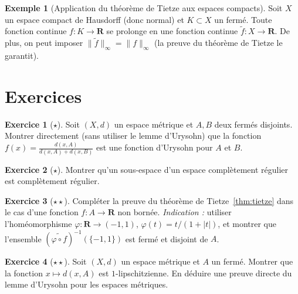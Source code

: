 \documentclass[12pt,a4paper,openany]{book}
\theoremstyle{definition}
\theoremstyle{cours}
\theoremstyle{coursnormal}
\newtheorem{exemple}[theoreme]{Exemple}
\newtheorem{exercice}{Exercice}[chapter]
\begin{document}
\begin{exemple}[Application du théorème de Tietze aux espaces compacts]
\label{ex:tietze-compact}
Soit $X$ un espace compact de Hausdorff (donc normal) et $K\subset X$
un fermé. Toute fonction continue $f\colon K\to\mathbf{R}$ se prolonge
en une fonction continue $\tilde{f}\colon X\to\mathbf{R}$. De plus,
on peut imposer $\|\tilde{f}\|_\infty=\|f\|_\infty$ (la preuve du
théorème de Tietze le garantit).
\end{exemple}

\section{Exercices}
\label{sec:exo-urysohn-tietze}

\begin{exercice}[$\star$]
\label{exo:urysohn-metrique-direct}
Soit $(X,d)$ un espace métrique et $A,B$ deux fermés disjoints.
Montrer directement (sans utiliser le lemme d'Urysohn) que la fonction
$f(x)=\frac{d(x,A)}{d(x,A)+d(x,B)}$ est une fonction d'Urysohn
pour $A$ et $B$.
\end{exercice}

\begin{exercice}[$\star$]
\label{exo:T3half-sous-espace}
Montrer qu'un sous-espace d'un espace complètement régulier est
complètement régulier.
\end{exercice}

\begin{exercice}[$\star\star$]
\label{exo:tietze-non-borne}
Compléter la preuve du théorème de Tietze~\ref{thm:tietze} dans le cas
d'une fonction $f\colon A\to\mathbf{R}$ non bornée. \textit{Indication :}
utiliser l'homéomorphisme $\varphi\colon\mathbf{R}\to(-1,1)$,
$\varphi(t)=t/(1+|t|)$, et montrer que l'ensemble
$(\widetilde{\varphi\circ f})^{-1}(\{-1,1\})$ est fermé et disjoint
de $A$.
\end{exercice}

\begin{exercice}[$\star\star$]
\label{exo:urysohn-fonction-lipschitz}
Soit $(X,d)$ un espace métrique et $A$ un fermé. Montrer que la
fonction $x\mapsto d(x,A)$ est $1$-lipschitzienne. En déduire
une preuve directe du lemme d'Urysohn pour les espaces métriques.
\end{exercice}
\end{document}
